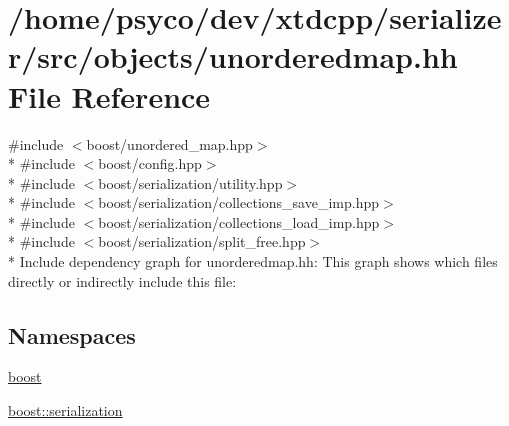 \hypertarget{unorderedmap_8hh}{}\section{/home/psyco/dev/xtdcpp/serializer/src/objects/unorderedmap.hh File Reference}
\label{unorderedmap_8hh}
{\ttfamily \#include $<$boost/unordered\+\_\+map.\+hpp$>$}\\*
{\ttfamily \#include $<$boost/config.\+hpp$>$}\\*
{\ttfamily \#include $<$boost/serialization/utility.\+hpp$>$}\\*
{\ttfamily \#include $<$boost/serialization/collections\+\_\+save\+\_\+imp.\+hpp$>$}\\*
{\ttfamily \#include $<$boost/serialization/collections\+\_\+load\+\_\+imp.\+hpp$>$}\\*
{\ttfamily \#include $<$boost/serialization/split\+\_\+free.\+hpp$>$}\\*
Include dependency graph for unorderedmap.\+hh\+:
This graph shows which files directly or indirectly include this file\+:
\subsection*{Namespaces}
\begin{DoxyCompactItemize}
\item 
 \hyperlink{namespaceboost}{boost}
\item 
 \hyperlink{namespaceboost_1_1serialization}{boost\+::serialization}
\end{DoxyCompactItemize}
